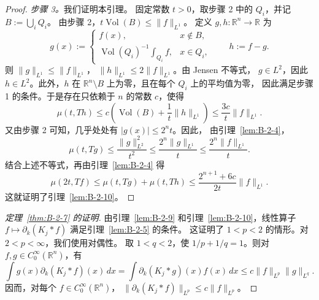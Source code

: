 \begin{proof}
\emph{步骤 3。}我们证明本引理。
固定常数 $t>0$，取步骤 2 中的 $Q_i$，并记 $B:=\bigcup_iQ_i$。
由步骤 2，$t\operatorname{Vol}(B)\le\|f\|_{L^1}$。
定义 $g,h:\mathbb R^n\to\mathbb R$ 为
\[
  g(x):=\begin{cases}
    f(x),&x\notin B,\\
    \operatorname{Vol}(Q_i)^{-1}\displaystyle\int_{Q_i}f,
      &x\in Q_i,
  \end{cases}
  \qquad h:=f-g.
\]
则 $\|g\|_{L^1}\le\|f\|_{L^1}$，
$\|h\|_{L^1}\le2\|f\|_{L^1}$。由 Jensen 不等式，
$g\in L^2$，因此 $h\in L^2$。此外，$h$ 在
$\mathbb R^n\setminus B$ 上为零，且在每个 $Q_i$ 上的平均值为零，
因此满足步骤 1 的条件。于是存在只依赖于 $n$ 的常数 $c$，使得
\[
  \mu(t,Th)
  \le c\left(\operatorname{Vol}(B)+\frac1t\|h\|_{L^1}\right)
  \le\frac{3c}{t}\|f\|_{L^1}.
\]
又由步骤 2 可知，几乎处处有 $|g(x)|\le2^nt$。因此，
由引理~\ref{lem:B-2-4}，
\[
  \mu(t,Tg)
  \le\frac{\|g\|_{L^2}^2}{t^2}
  \le\frac{2^n\|g\|_{L^1}}{t}
  \le\frac{2^n\|f\|_{L^1}}{t}.
\]
结合上述不等式，再由引理~\ref{lem:B-2-4} 得
\[
  \mu(2t,Tf)
  \le\mu(t,Tg)+\mu(t,Th)
  \le\frac{2^{n+1}+6c}{2t}\|f\|_{L^1}.
\]
这就证明了引理~\ref{lem:B-2-10}。
\end{proof}

\begin{proof}[定理~\ref{thm:B-2-7} 的证明]
由引理~\ref{lem:B-2-9} 和引理~\ref{lem:B-2-10}，线性算子
$f\mapsto\partial_k(K_j*f)$ 满足引理~\ref{lem:B-2-5} 的条件。
这证明了 $1<p<2$ 的情形。对 $2<p<\infty$，我们使用对偶性。
取 $1<q<2$，使 $1/p+1/q=1$。则对
$f,g\in C_0^\infty(\mathbb R^n)$，有
\[
  \int g(x)\partial_k(K_j*f)(x)\,dx
  =\int\partial_k(K_j*g)(x)f(x)\,dx
  \le c\|f\|_{L^p}\|g\|_{L^q}.
\]
因而，对每个 $f\in C_0^\infty(\mathbb R^n)$，
$\|\partial_k(K_j*f)\|_{L^p}\le c\|f\|_{L^p}$。
\end{proof}
